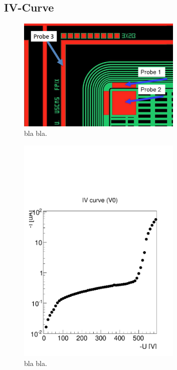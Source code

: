\subsection{IV-Curve}
\begin{figure}[!h]
  \centering
  \includegraphics[width=0.7\textwidth]{../images/ch7/sensor_probe_positions}
  \caption[bla for index.]{bla bla.}\label{fig:sensor_probe_positions}
\end{figure}

\begin{figure}[!h]
  \centering
  \includegraphics[width=0.7\textwidth]{../images/ch7/iv_test}
  \caption[bla for index.]{bla bla.}\label{fig:vis_insp}
\end{figure}

